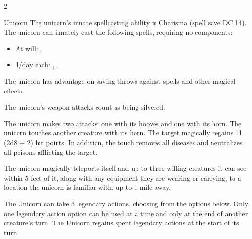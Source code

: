 \begin{multicols}{2}
\begin{DndMonster}{Unicorn}
 The unicorn's innate spellcasting ability is Charisma (spell save DC 14). The unicorn can innately cast the following spells, requiring no components:
\begin{itemize}
	\item[] At will: , 
	\item[] 1/day each: , , 
\end{itemize}

 The unicorn has advantage on saving throws against spells and other magical effects.

 The unicorn's weapon attacks count as being silvered.

 The unicorn makes two attacks: one with its hooves and one with its horn.
\DndMonsterAttack[
	name=Hooves,
	distance=melee,
	type=weapon,
	mod=+7,
	reach=5,
	dmg=\DndDice{2d4 + 4},
	dmg-type=bludgeoning
]
\DndMonsterAttack[
	name=Horn,
	distance=melee,
	type=weapon,
	mod=+7,
	reach=5,
	dmg=\DndDice{1d8 + 4},
	dmg-type=piercing
]
The unicorn touches another creature with its horn. The target magically regains 11 (2d8 + 2) hit points. In addition, the touch removes all diseases and neutralizes all poisons afflicting the target.

The unicorn magically teleports itself and up to three willing creatures it can see within 5 feet of it, along with any equipment they are wearing or carrying, to a location the unicorn is familiar with, up to 1 mile away.


The Unicorn can take 3 legendary actions, choosing from the options below. Only one legendary action option can be used at a time and only at the end of another creature's turn. The Unicorn regains spent legendary actions at the start of its turn.

\begin{DndMonsterLegendaryActions}
\end{DndMonsterLegendaryActions}
\end{DndMonster}
\end{multicols}